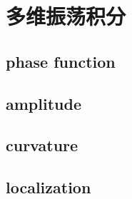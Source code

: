 \section{多维振荡积分}
\label{b2:sec:2103}


\subsection{phase function}
\label{b2:subsec:210301}

\subsection{amplitude}
\label{b2:subsec:210302}

\subsection{curvature}
\label{b2:subsec:210303}

\subsection{localization}
\label{b2:subsec:210304}



